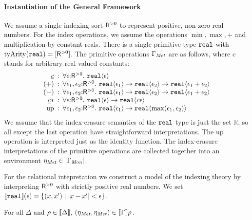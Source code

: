 \paragraph{Instantiation of the General Framework}
We assume a single indexing sort $\mathsf{R}^{>0}$ %
to represent positive, non-zero real numbers. For the index
operations, we assume the operations $\min, \max, +$ and
multiplication by constant reals. There is a single primitive type
$\textup{\texttt{real}}$ with $\mathrm{tyArity}(\textup{\texttt{real}}) =
[\mathsf{R}^{>0}]$. The primitive operations $\Gamma_{\mathit{Met}}$ are as
follows, where $c$ stands for arbitrary real-valued constants:
\begin{displaymath}
  \begin{array}{r@{\hspace{0.5em}:\hspace{0.5em}}l}
    \underline{c} & \forall \epsilon\mathord:\metricSort.\ \tyPrim{real}{\epsilon} \\
    (+) & \forall \epsilon_1, \epsilon_2\mathord:\metricSort.\ \tyPrim{real}{\epsilon_1} \to \tyPrim{real}{\epsilon_2} \to \tyPrim{real}{\epsilon_1 + \epsilon_2} \\
    (-) & \forall \epsilon_1, \epsilon_2\mathord:\metricSort.\ \tyPrim{real}{\epsilon_1} \to \tyPrim{real}{\epsilon_2} \to \tyPrim{real}{\epsilon_1 + \epsilon_2} \\
    \underline{c} * & \forall \epsilon\mathord:\metricSort.\ \tyPrim{real}{\epsilon} \to \tyPrim{real}{c\epsilon} \\
    \mathrm{up} & \forall \epsilon_1,\epsilon_2\mathord:\metricSort.\ \tyPrim{real}{\epsilon_1} \to \tyPrim{real}{\max(\epsilon_1,\epsilon_2)}
  \end{array}
\end{displaymath}
We assume that the index-erasure semantics of the $\textup{\texttt{real}}$
type is just the set $\mathbb{R}$, so all except the last operation
have straightforward interpretations. The $\mathrm{up}$ operation is
interpreted just as the identity function. The index-erasure
interpretations of the primitive operations are collected together
into an environment $\eta_{\mathit{Met}} \in \left| \Gamma_{\textit{Mon}}\right|$.

For the relational intepretation we construct a model of the indexing
theory by interpreting $\mathsf{R}^{>0}$ with strictly positive real
numbers. We set $\llbracket \textup{\texttt{real}} \rrbracket(\epsilon) = \{ (x,x') \mathrel|
\lvert x - x' \rvert < \epsilon \}$.
\begin{lemma}\label{lem:metric-environments}
  For all $\Delta$ and $\rho \in \llbracket \Delta \rrbracket$, $(\eta_{\mathit{Met}},
  \eta_{\mathit{Met}}) \in \llbracket \Gamma \rrbracket{\rho}$.
\end{lemma}

